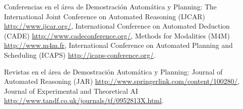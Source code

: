\begin{myitemize}
\item Conferencias en el \'area de Demostraci\'on Autom\'atica y Planning:
The International Joint Conference on
Automated Reasoning (IJCAR) \url{http://www.ijcar.org/}, 
International Conference on Automated Deduction (CADE) \url{http://www.cadeconference.org/},
Methods for Modalities (M4M) \url{http://www.m4m.fr},
International Conference on Automated Planning and Scheduling (ICAPS)
\url{http://icaps-conference.org/}.

\item Revistas en el \'area de Demostraci\'on Autom\'atica y Planning:
Journal of Automated Reasoning (JAR) \url{http://www.springerlink.com/content/100280/},
Journal of Experimental and Theoretical AI 
\url{http://www.tandf.co.uk/journals/tf/0952813X.html}.


\end{myitemize}

